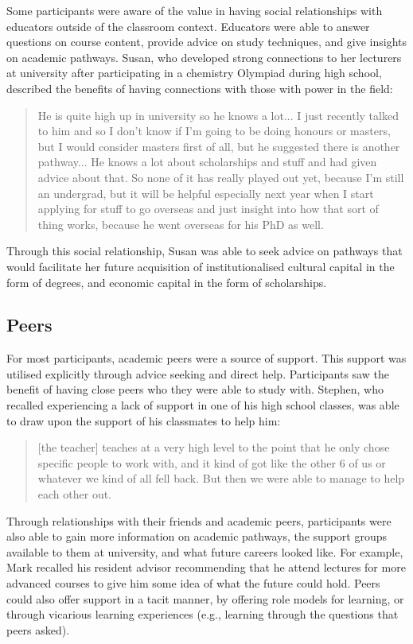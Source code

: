 Some participants were aware of the value in having social relationships with educators outside of the classroom context. Educators were able to answer questions on course content, provide advice on study techniques, and give insights on academic pathways. Susan, who developed strong connections to her lecturers at university after participating in a chemistry Olympiad during high school, described the benefits of having connections with those with power in the field: \blockquote{He is quite high up in university so he knows a lot... I just recently talked to him and so I don’t know if I’m going to be doing honours or masters, but I would consider masters first of all, but he suggested there is another pathway... He knows a lot about scholarships and stuff and had given advice about that. So none of it has really played out yet, because I’m still an undergrad, but it will be helpful especially next year when I start applying for stuff to go overseas and just insight into how that sort of thing works, because he went overseas for his PhD as well.} Through this social relationship, Susan was able to seek advice on pathways that would facilitate her future acquisition of institutionalised cultural capital in the form of degrees, and economic capital in the form of scholarships. 


\subsection{Peers}
For most participants, academic peers were a source of support. This support was utilised explicitly through advice seeking and direct help. Participants saw the benefit of having close peers who they were able to study with. Stephen, who recalled experiencing a lack of support in one of his high school classes, was able to draw upon the support of his classmates to help him: \blockquote{[the teacher] teaches at a very high level to the point that he only chose specific people to work with, and it kind of got like the other 6 of us or whatever we kind of all fell back. But then we were able to manage to help each other out.}  Through relationships with their friends and academic peers, participants were also able to gain more information on academic pathways, the support groups available to them at university, and what future careers looked like. For example, Mark recalled his resident advisor recommending that he attend lectures for more advanced courses to give him some idea of what the future could hold. Peers could also offer support in a tacit manner, by offering role models for learning, or through vicarious learning experiences (e.g., learning through the questions that peers asked). 

